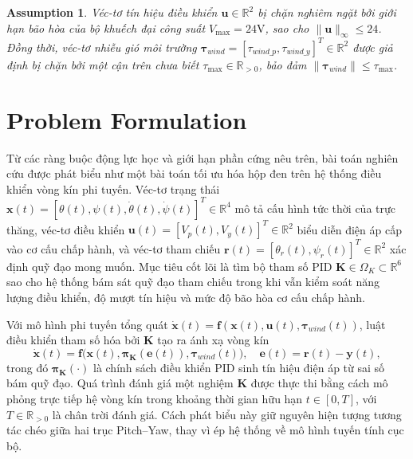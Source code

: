 \documentclass[conference, a4paper]{IEEEtran}
\newtheorem{assumption}{Assumption}
\begin{document}
\begin{assumption}
Véc-tơ tín hiệu điều khiển $\mathbf{u} \in \mathbb{R}^{2}$ bị chặn nghiêm ngặt bởi giới hạn bão hòa của bộ khuếch đại công suất $V_{\max}=24\text{V}$, sao cho $\|\mathbf{u}\|_{\infty} \le 24$. Đồng thời, véc-tơ nhiễu gió môi trường $\boldsymbol{\tau}_{wind}=[\tau_{wind\_p},\tau_{wind\_y}]^T \in \mathbb{R}^{2}$ được giả định bị chặn bởi một cận trên chưa biết $\tau_{\max} \in \mathbb{R}_{>0}$, bảo đảm $\|\boldsymbol{\tau}_{wind}\| \le \tau_{\max}$.
\end{assumption}

\section{Problem Formulation}
Từ các ràng buộc động lực học và giới hạn phần cứng nêu trên, bài toán nghiên cứu được phát biểu như một bài toán tối ưu hóa hộp đen trên hệ thống điều khiển vòng kín phi tuyến. Véc-tơ trạng thái $\mathbf{x}(t) = [\theta(t), \psi(t), \dot{\theta}(t), \dot{\psi}(t)]^T \in \mathbb{R}^{4}$ mô tả cấu hình tức thời của trực thăng, véc-tơ điều khiển $\mathbf{u}(t) = [V_p(t), V_y(t)]^T \in \mathbb{R}^{2}$ biểu diễn điện áp cấp vào cơ cấu chấp hành, và véc-tơ tham chiếu $\mathbf{r}(t) = [\theta_r(t), \psi_r(t)]^T \in \mathbb{R}^{2}$ xác định quỹ đạo mong muốn. Mục tiêu cốt lõi là tìm bộ tham số PID $\boldsymbol{K} \in \Omega_K \subset \mathbb{R}^{6}$ sao cho hệ thống bám sát quỹ đạo tham chiếu trong khi vẫn kiểm soát năng lượng điều khiển, độ mượt tín hiệu và mức độ bão hòa cơ cấu chấp hành.

Với mô hình phi tuyến tổng quát $\dot{\mathbf{x}}(t) = \mathbf{f}(\mathbf{x}(t),\mathbf{u}(t),\boldsymbol{\tau}_{wind}(t))$, luật điều khiển tham số hóa bởi $\boldsymbol{K}$ tạo ra ánh xạ vòng kín
\begin{equation}
\dot{\mathbf{x}}(t) = \mathbf{f}\big(\mathbf{x}(t),\boldsymbol{\pi}_{\boldsymbol{K}}(\mathbf{e}(t)),\boldsymbol{\tau}_{wind}(t)\big), \quad \mathbf{e}(t)=\mathbf{r}(t)-\mathbf{y}(t),
\end{equation}
trong đó $\boldsymbol{\pi}_{\boldsymbol{K}}(\cdot)$ là chính sách điều khiển PID sinh tín hiệu điện áp từ sai số bám quỹ đạo. Quá trình đánh giá một nghiệm $\boldsymbol{K}$ được thực thi bằng cách mô phỏng trực tiếp hệ vòng kín trong khoảng thời gian hữu hạn $t \in [0,T]$, với $T \in \mathbb{R}_{>0}$ là chân trời đánh giá. Cách phát biểu này giữ nguyên hiện tượng tương tác chéo giữa hai trục Pitch--Yaw, thay vì ép hệ thống về mô hình tuyến tính cục bộ.
\end{document}

